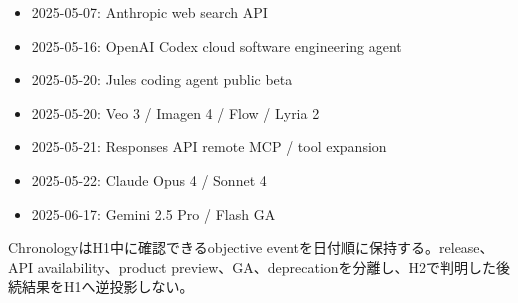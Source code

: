 \begin{itemize}
  \item 2025-05-07: Anthropic web search API
  \item 2025-05-16: OpenAI Codex cloud software engineering agent
  \item 2025-05-20: Jules coding agent public beta
  \item 2025-05-20: Veo 3 / Imagen 4 / Flow / Lyria 2
  \item 2025-05-21: Responses API remote MCP / tool expansion
  \item 2025-05-22: Claude Opus 4 / Sonnet 4
\end{itemize}
\autocite{src-4ec03078d316,src-8b595b787bad,src-9257c39d4172,src-e31c642d34b6,src-e68f8ce96685,src-e7aef8f1b13b}

\begin{itemize}
  \item 2025-06-17: Gemini 2.5 Pro / Flash GA
\end{itemize}
\autocite{src-53f15d483a2d}

\begin{claimboundary}
ChronologyはH1中に確認できるobjective eventを日付順に保持する。release、API availability、product preview、GA、deprecationを分離し、H2で判明した後続結果をH1へ逆投影しない。
\end{claimboundary}
